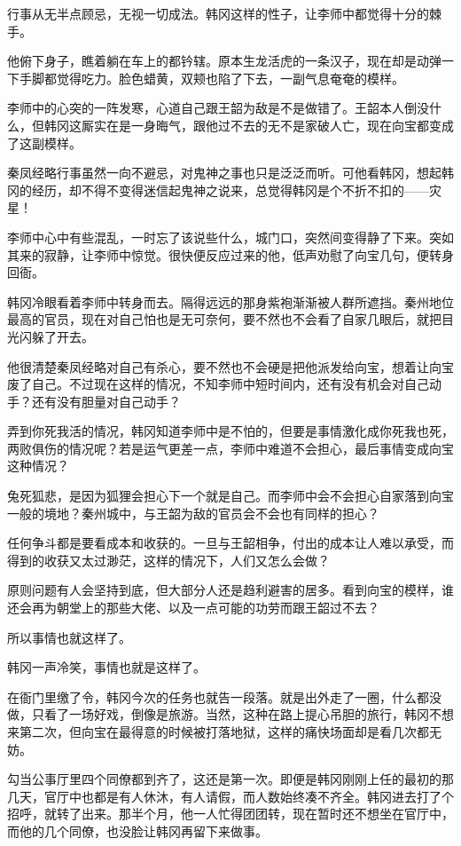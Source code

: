 行事从无半点顾忌，无视一切成法。韩冈这样的性子，让李师中都觉得十分的棘手。

他俯下身子，瞧着躺在车上的都钤辖。原本生龙活虎的一条汉子，现在却是动弹一下手脚都觉得吃力。脸色蜡黄，双颊也陷了下去，一副气息奄奄的模样。

李师中的心突的一阵发寒，心道自己跟王韶为敌是不是做错了。王韶本人倒没什么，但韩冈这厮实在是一身晦气，跟他过不去的无不是家破人亡，现在向宝都变成了这副模样。

秦凤经略行事虽然一向不避忌，对鬼神之事也只是泛泛而听。可他看韩冈，想起韩冈的经历，却不得不变得迷信起鬼神之说来，总觉得韩冈是个不折不扣的——灾星！

李师中心中有些混乱，一时忘了该说些什么，城门口，突然间变得静了下来。突如其来的寂静，让李师中惊觉。很快便反应过来的他，低声劝慰了向宝几句，便转身回衙。

韩冈冷眼看着李师中转身而去。隔得远远的那身紫袍渐渐被人群所遮挡。秦州地位最高的官员，现在对自己怕也是无可奈何，要不然也不会看了自家几眼后，就把目光闪躲了开去。

他很清楚秦凤经略对自己有杀心，要不然也不会硬是把他派发给向宝，想着让向宝废了自己。不过现在这样的情况，不知李师中短时间内，还有没有机会对自己动手？还有没有胆量对自己动手？

弄到你死我活的情况，韩冈知道李师中是不怕的，但要是事情激化成你死我也死，两败俱伤的情况呢？若是运气更差一点，李师中难道不会担心，最后事情变成向宝这种情况？

兔死狐悲，是因为狐狸会担心下一个就是自己。而李师中会不会担心自家落到向宝一般的境地？秦州城中，与王韶为敌的官员会不会也有同样的担心？

任何争斗都是要看成本和收获的。一旦与王韶相争，付出的成本让人难以承受，而得到的收获又太过渺茫，这样的情况下，人们又怎么会做？

原则问题有人会坚持到底，但大部分人还是趋利避害的居多。看到向宝的模样，谁还会再为朝堂上的那些大佬、以及一点可能的功劳而跟王韶过不去？

所以事情也就这样了。

韩冈一声冷笑，事情也就是这样了。

在衙门里缴了令，韩冈今次的任务也就告一段落。就是出外走了一圈，什么都没做，只看了一场好戏，倒像是旅游。当然，这种在路上提心吊胆的旅行，韩冈不想来第二次，但向宝在最得意的时候被打落地狱，这样的痛快场面却是看几次都无妨。

勾当公事厅里四个同僚都到齐了，这还是第一次。即便是韩冈刚刚上任的最初的那几天，官厅中也都是有人休沐，有人请假，而人数始终凑不齐全。韩冈进去打了个招呼，就转了出来。那半个月，他一人忙得团团转，现在暂时还不想坐在官厅中，而他的几个同僚，也没脸让韩冈再留下来做事。


